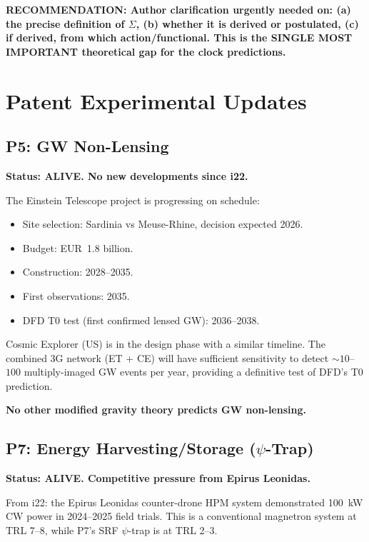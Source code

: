 \documentclass[11pt]{article}
\begin{document}
\textbf{RECOMMENDATION: Author clarification urgently needed on:
(a) the precise definition of $\Sigma$, (b) whether it is derived
or postulated, (c) if derived, from which action/functional.  This
is the SINGLE MOST IMPORTANT theoretical gap for the clock predictions.}

\section{Patent Experimental Updates}
\label{sec:experimental}

\subsection{P5: GW Non-Lensing}

\textbf{Status: ALIVE.  No new developments since i22.}

The Einstein Telescope project is progressing on schedule:
\begin{itemize}
\item Site selection: Sardinia vs Meuse-Rhine, decision expected 2026.
\item Budget: EUR~1.8 billion.
\item Construction: 2028--2035.
\item First observations: 2035.
\item DFD T0 test (first confirmed lensed GW): 2036--2038.
\end{itemize}

Cosmic Explorer (US) is in the design phase with a similar timeline.
The combined 3G network (ET + CE) will have sufficient sensitivity to
detect $\sim 10$--$100$ multiply-imaged GW events per year, providing
a definitive test of DFD's T0 prediction.

\textbf{No other modified gravity theory predicts GW non-lensing.}

\subsection{P7: Energy Harvesting/Storage ($\psi$-Trap)}

\textbf{Status: ALIVE.  Competitive pressure from Epirus Leonidas.}

From i22: the Epirus Leonidas counter-drone HPM system demonstrated
100~kW CW power in 2024--2025 field trials.  This is a conventional
magnetron system at TRL 7--8, while P7's SRF $\psi$-trap is at TRL 2--3.
\end{document}
